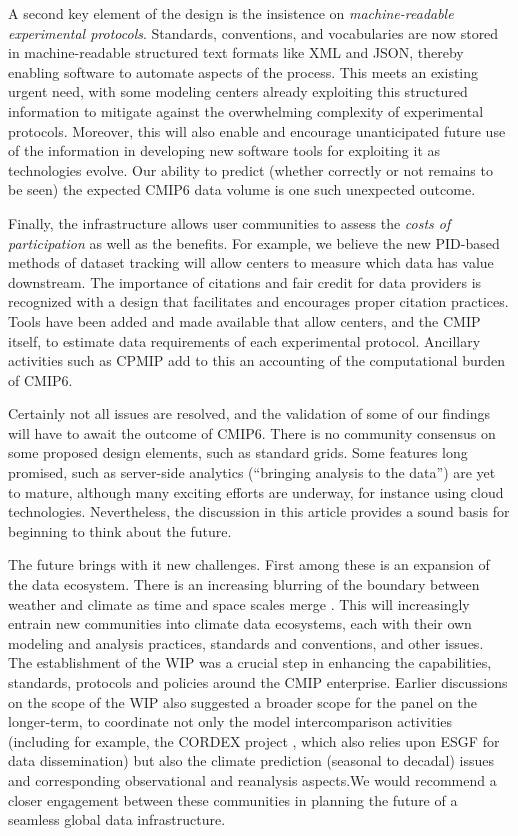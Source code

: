\documentclass[gmd,manuscript]{copernicus}
\newcommand{\pllabel}[1]{\label{p-#1}\linelabel{l-#1}}
\begin{document}
A second key element of the design is the insistence on
\emph{machine-readable experimental protocols}. Standards,
conventions, and vocabularies are now stored in machine-readable
structured text formats like XML and JSON, thereby enabling software
to automate aspects of the process. This meets an existing urgent
need, with some modeling centers already exploiting this structured
information to mitigate against the overwhelming complexity of
experimental protocols. Moreover, this will also enable and encourage
unanticipated future use of the information in developing new software
tools for exploiting it as technologies evolve. Our ability to predict
(whether correctly or not remains to be seen) the expected CMIP6 data
volume is one such unexpected outcome.

Finally, the infrastructure allows user communities to assess the
\emph{costs of participation} as well as the benefits. For example, we
believe the new PID-based methods of dataset tracking will allow
centers to measure which data has value downstream. The importance of
citations and fair credit for data providers is recognized with a
design that facilitates and encourages proper citation practices.
Tools have been added and made available that allow centers, and the
CMIP itself, to estimate data requirements of each experimental
protocol. Ancillary activities such as CPMIP add to this an accounting
of the computational burden of CMIP6.

Certainly not all issues are resolved, and the validation of some of
our findings will have to await the outcome of CMIP6. There is no
community consensus on some proposed design elements, such as standard
grids. Some features long promised, such as server-side analytics
(``bringing analysis to the data'') are yet to mature, although many
exciting efforts are underway, for instance using cloud technologies.
Nevertheless, the discussion in this article provides a sound basis
for beginning to think about the future.

The future brings with it new challenges. First among these is an
expansion of the data ecosystem. There is an increasing blurring of
the boundary between weather and climate as time and space scales
merge \citep{ref:hoskins2013}. This will increasingly entrain new
communities into \pllabel{RC1-64} climate data ecosystems, each with
their own modeling and analysis practices, standards and conventions,
and other issues. The establishment of the WIP was a crucial step in
enhancing the capabilities, standards, protocols and policies around
the CMIP enterprise. Earlier discussions on the scope of the WIP also
suggested a broader scope for the panel on the longer-term, to
coordinate not only the model intercomparison activities (including for example, the
CORDEX project \citep{ref:lakeetal2017}, which also relies upon ESGF
for data dissemination) but also the climate prediction (seasonal to
decadal) issues and corresponding observational and reanalysis
aspects.We would recommend a closer engagement between these
communities in planning the future of a seamless global data
infrastructure.
\end{document}
